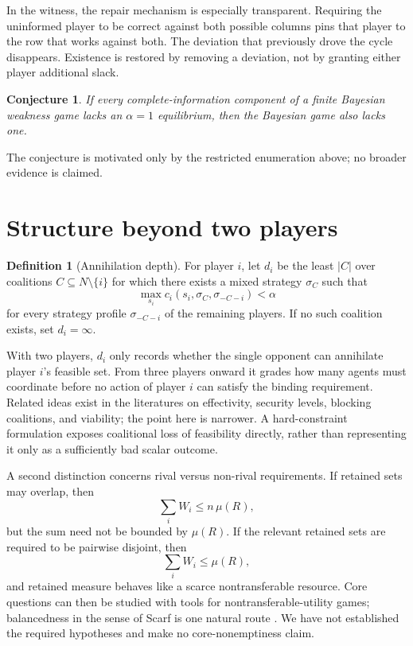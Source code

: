 \documentclass[11pt]{article}
\newtheorem{conjecture}[theorem]{Conjecture}
\theoremstyle{definition}
\newtheorem{definition}[theorem]{Definition}
\begin{document}
In the witness, the repair mechanism is especially transparent. Requiring the uninformed player to be correct against both possible columns pins that player to the row that works against both. The deviation that previously drove the cycle disappears. Existence is restored by removing a deviation, not by granting either player additional slack.

\begin{conjecture}
If every complete-information component of a finite Bayesian weakness game lacks an $\alpha=1$ equilibrium, then the Bayesian game also lacks one.
\end{conjecture}

The conjecture is motivated only by the restricted enumeration above; no broader evidence is claimed.

\section{Structure beyond two players}
\begin{definition}[Annihilation depth]
For player $i$, let $d_i$ be the least $|C|$ over coalitions $C\subseteq N\setminus\{i\}$ for which there exists a mixed strategy $\sigma_C$ such that
\[
\max_{s_i}c_i(s_i,\sigma_C,\sigma_{-C-i})<\alpha
\]
for every strategy profile $\sigma_{-C-i}$ of the remaining players. If no such coalition exists, set $d_i=\infty$.
\end{definition}

With two players, $d_i$ only records whether the single opponent can annihilate player $i$'s feasible set. From three players onward it grades how many agents must coordinate before no action of player $i$ can satisfy the binding requirement. Related ideas exist in the literatures on effectivity, security levels, blocking coalitions, and viability; the point here is narrower. A hard-constraint formulation exposes coalitional loss of feasibility directly, rather than representing it only as a sufficiently bad scalar outcome.

A second distinction concerns rival versus non-rival requirements. If retained sets may overlap, then
\[
\sum_i W_i\le n\,\mu(R),
\]
but the sum need not be bounded by $\mu(R)$. If the relevant retained sets are required to be pairwise disjoint, then
\[
\sum_i W_i\le\mu(R),
\]
and retained measure behaves like a scarce nontransferable resource. Core questions can then be studied with tools for nontransferable-utility games; balancedness in the sense of Scarf is one natural route \cite{scarf}. We have not established the required hypotheses and make no core-nonemptiness claim.
\end{document}
